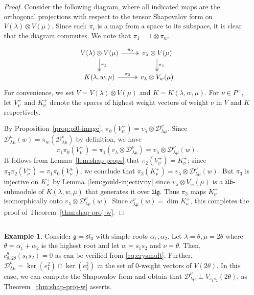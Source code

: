 \documentclass[12pt,reqno]{amsart}
\theoremstyle{plain}
\theoremstyle{definition}
\newtheorem{example}[theorem]{Example}
\theoremstyle{remark}
\theoremstyle{plain}
\newcommand{\mcdw}{\mathcal{D}_{\!\lambda\mu}^{\nu}(w)}
\newcommand{\mcd}{\mathcal{D}_{\!\lambda\mu}^{\nu}}
\newcommand{\lie}{\mathfrak}
\newcommand{\lrw}{c_{\lambda\mu}^\nu(w)}
\begin{document}
\begin{proof}
Consider the following diagram, where all indicated maps are the orthogonal projections with respect to the tensor Shapovalov form on $V(\lambda) \otimes V(\mu)$. Since each $\pi_i$ is a map from a space to its subspace, it is clear that the diagram commutes. We note that $\pi_1 = 1 \otimes \pi_w$.


\[ 
\begin{tikzcd}
V(\lambda) \otimes V(\mu) \arrow[r, two heads, "\pi_0"] \arrow[d, two heads, "\pi_2"] & v_\lambda \otimes V(\mu) \arrow[d, two heads, "\pi_1"] \\
K(\lambda,w,\mu) \arrow[r, two heads, "\pi_3"] & v_\lambda \otimes V_w(\mu)
\end{tikzcd}
\]
For convenience, we set $V = V(\lambda) \otimes V(\mu)$ and $K = K(\lambda,w,\mu)$. For $\nu \in P^+$, let $V^+_\nu$ and $K^+_\nu$ denote the spaces of highest weight vectors of weight $\nu$ in $V$ and $K$ respectively. 

By Proposition~\ref{prop:pi0-image}, $\pi_0(V_\nu^+)= v_{\lambda}\otimes \mcd$. Since $\mcdw = \pi_w(\mcd)$ by definition, we have 
\[\pi_1\pi_0(V^+_\nu) = \pi_1 (v_\lambda \otimes \mcd) = v_\lambda \otimes \mcdw.\] 
It follows from Lemma~\ref{lem:shap-props} that $\pi_2(V^+_\nu) = K^+_\nu$; since $\pi_3\pi_2 (V^+_\nu)= \pi_1\pi_0(V^+_\nu)$, we conclude that $\pi_3(K^+_\nu) = v_\lambda \otimes \mcdw$. But $\pi_3$ is injective on $K^+_\nu$ by Lemma~\ref{lem:gould-injectivity} since $v_\lambda \otimes V_w(\mu)$ is a $\lie{Ub}$-submodule of $K(\lambda,w,\mu)$ that generates it over $\lie{Ug}$.  Thus $\pi_3$ maps $K^+_\nu$ isomorphically onto $v_\lambda \otimes \mcdw$. Since $\lrw = \dim K^+_\nu$, this completes the proof of Theorem~\ref{thm:shap-proj-w}.
\end{proof}

\subsection{}
\begin{example}
Consider $\mathfrak{g}=\mathfrak{sl}_3$ with simple roots $\alpha_1, \alpha_2$. Let $\lambda = \theta, \mu = 2\theta$ where $\theta=\alpha_1+\alpha_2$ is the highest root and let $w=s_1s_2$ and $\nu=\theta$. Then, $c_{\theta,2\theta}^{\theta}(s_1s_2)=0$ as can be verified from \eqref{eq:crysmult}. Further, $\mcd=\ker (e_1^2)\cap \ker (e_2^2)$ in the set of $0$-weight vectors of $V(2\theta)$. In this case, we can compute the Shapovalov form and obtain that 
$ \mcd\perp V_{s_1s_2}(2\theta)$, as Theorem~\ref{thm:shap-proj-w} asserts.
\end{example}
\end{document}
